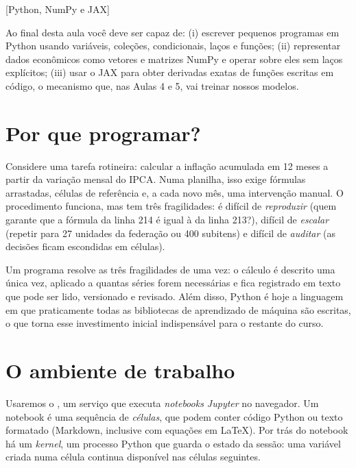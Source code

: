 [Python, NumPy e JAX]

\begin{intuicao}[title={Objetivos da aula}]
Ao final desta aula você deve ser capaz de: (i) escrever pequenos programas em
Python usando variáveis, coleções, condicionais, laços e funções; (ii)
representar dados econômicos como vetores e matrizes NumPy e operar sobre eles
sem laços explícitos; (iii) usar o JAX para obter derivadas exatas de funções
escritas em código, o mecanismo que, nas Aulas 4 e 5, vai treinar nossos modelos.
\end{intuicao}

\section{Por que programar?}

Considere uma tarefa rotineira: calcular a inflação acumulada em 12 meses a
partir da variação mensal do IPCA. Numa planilha, isso exige fórmulas
arrastadas, células de referência e, a cada novo mês, uma intervenção manual.
O procedimento funciona, mas tem três fragilidades: é difícil de \emph{reproduzir}
(quem garante que a fórmula da linha 214 é igual à da linha 213?), difícil de
\emph{escalar} (repetir para 27 unidades da federação ou 400 subitens) e difícil
de \emph{auditar} (as decisões ficam escondidas em células).

Um programa resolve as três fragilidades de uma vez: o cálculo é descrito uma
única vez, aplicado a quantas séries forem necessárias e fica registrado em texto
que pode ser lido, versionado e revisado. Além disso, Python é hoje a
linguagem em que praticamente todas as bibliotecas de aprendizado de máquina
são escritas, o que torna esse investimento inicial indispensável para o
restante do curso.

\section{O ambiente de trabalho}

Usaremos o , um serviço que executa \emph{notebooks Jupyter}
no navegador. Um notebook é uma sequência de \emph{células}, que podem conter
código Python ou texto formatado (Markdown, inclusive com equações em \LaTeX).
Por trás do notebook há um \emph{kernel}, um processo Python que guarda o
estado da sessão: uma variável criada numa célula continua disponível nas
células seguintes.

